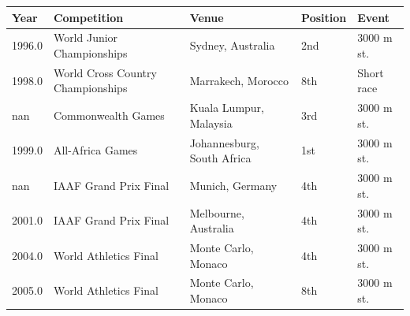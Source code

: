 \documentclass{article}
\begin{document}
\begin{tabular}{lllll}
\toprule
Year & Competition & Venue & Position & Event \\
\midrule
1996.0 & World Junior Championships & Sydney, Australia & 2nd & 3000 m st. \\
1998.0 & World Cross Country Championships & Marrakech, Morocco & 8th & Short race \\
nan & Commonwealth Games & Kuala Lumpur, Malaysia & 3rd & 3000 m st. \\
1999.0 & All-Africa Games & Johannesburg, South Africa & 1st & 3000 m st. \\
nan & IAAF Grand Prix Final & Munich, Germany & 4th & 3000 m st. \\
2001.0 & IAAF Grand Prix Final & Melbourne, Australia & 4th & 3000 m st. \\
2004.0 & World Athletics Final & Monte Carlo, Monaco & 4th & 3000 m st. \\
2005.0 & World Athletics Final & Monte Carlo, Monaco & 8th & 3000 m st. \\
\bottomrule
\end{tabular}
\end{document}
